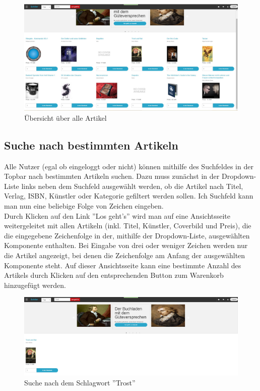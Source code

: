 \documentclass[a4paper]{article}
\begin{document}
\begin{figure}[ht]
\centering
\includegraphics[width=1.0\textwidth]{Artikel.jpg}
\caption{Übersicht über alle Artikel}
\end{figure}
\smallskip

\FloatBarrier

\subsection{Suche nach bestimmten Artikeln} \label{suche} 

Alle Nutzer (egal ob eingeloggt oder nicht) können mithilfe des Suchfeldes in der Topbar nach bestimmten Artikeln suchen. Dazu muss zunächst in der Dropdown-Liste links neben dem Suchfeld ausgewählt werden, ob die Artikel nach Titel, Verlag, ISBN, Künstler oder Kategorie gefiltert werden sollen. Ich Suchfeld kann man nun eine beliebige Folge von Zeichen eingeben. \\
Durch Klicken auf den Link ''Los geht's'' wird man auf eine Ansichtsseite weitergeleitet mit allen Artikeln (inkl. Titel, Künstler, Coverbild und Preis), die die eingegebene Zeichenfolge in der, mithilfe der Dropdown-Liste, ausgewählten Komponente enthalten. Bei Eingabe von drei oder weniger Zeichen werden nur die Artikel angezeigt, bei denen die Zeichenfolge am Anfang der ausgewählten Komponente steht. Auf dieser Ansichtsseite kann eine bestimmte Anzahl des Artikels durch Klicken auf den entsprechenden Button zum Warenkorb hinzugefügt werden.

\begin{figure}[ht]
\centering
\includegraphics[width=1.0\textwidth]{Suche.jpg}
\caption{Suche nach dem Schlagwort ''Trost''}
\end{figure}
\smallskip
\end{document}
